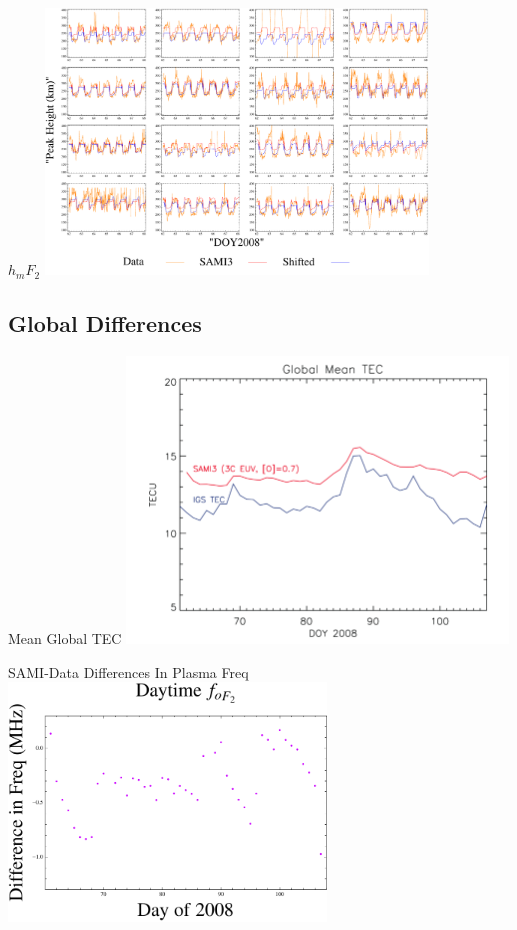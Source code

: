 \documentclass{beamer}
\begin{document}
\begin{frame}{$h_mF_2$}
  \includegraphics[width=4in]{hs}
\end{frame}

\subsection{Global Differences}
\begin{frame}{Mean Global TEC}
  \includegraphics[height=3in]{tec}
\end{frame}

\begin{frame}{SAMI-Data Differences In Plasma Freq}
  \includegraphics[height=2.5in]{dayf}
\end{frame}
\end{document}
